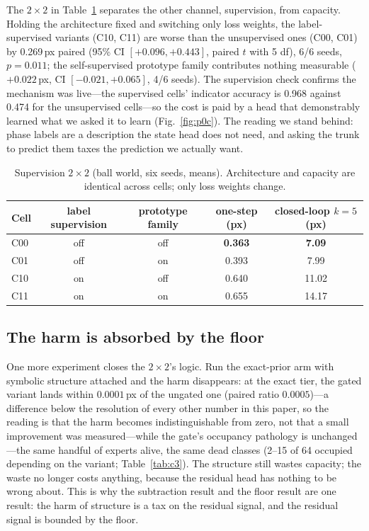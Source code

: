 \documentclass{article}
\begin{document}
The $2\times2$ in Table~\ref{tab:p0c} separates the other channel, supervision, from capacity. Holding the architecture fixed and switching only loss weights, the label-supervised variants (C10, C11) are worse than the unsupervised ones (C00, C01) by 0.269\,px paired (95\% CI $[+0.096, +0.443]$, paired $t$ with 5 df), 6/6 seeds, $p=0.011$; the self-supervised prototype family contributes nothing measurable ($+0.022$\,px, CI $[-0.021, +0.065]$, 4/6 seeds). The supervision check confirms the mechanism was live---the supervised cells' indicator accuracy is 0.968 against 0.474 for the unsupervised cells---so the cost is paid by a head that demonstrably learned what we asked it to learn (Fig.~\ref{fig:p0c}). The reading we stand behind: phase labels are a description the state head does not need, and asking the trunk to predict them taxes the prediction we actually want.

\begin{table}[t]
\centering
\caption{Supervision $2\times2$ (ball world, six seeds, means). Architecture and capacity are identical across cells; only loss weights change.}
\label{tab:p0c}
\small
\begin{tabular}{lcccc}
\toprule
Cell & label supervision & prototype family & one-step (px) & closed-loop $k{=}5$ (px) \\
\midrule
C00 & off & off & \textbf{0.363} & \textbf{7.09} \\
C01 & off & on  & 0.393 & 7.99 \\
C10 & on  & off & 0.640 & 11.02 \\
C11 & on  & on  & 0.655 & 14.17 \\
\bottomrule
\end{tabular}
\end{table}

\subsection{The harm is absorbed by the floor}

One more experiment closes the $2\times2$'s logic. Run the exact-prior arm with symbolic structure attached and the harm disappears: at the exact tier, the gated variant lands within $0.0001$\,px of the ungated one (paired ratio $0.0005$)---a difference below the resolution of every other number in this paper, so the reading is that the harm becomes indistinguishable from zero, not that a small improvement was measured---while the gate's occupancy pathology is unchanged---the same handful of experts alive, the same dead classes (2--15 of 64 occupied depending on the variant; Table~\ref{tab:c3}). The structure still wastes capacity; the waste no longer costs anything, because the residual head has nothing to be wrong about. This is why the subtraction result and the floor result are one result: the harm of structure is a tax on the residual signal, and the residual signal is bounded by the floor.
\end{document}
